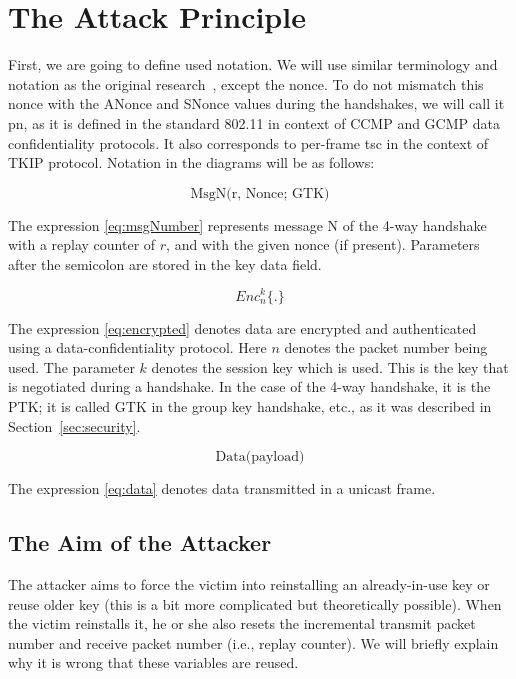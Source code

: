 \section{The Attack Principle}
\label{sec:attackPrinciple}
First, we are going to define used notation. We will use similar terminology and notation as the original research~\cite{VA_ccs2017}, except the nonce. To do not mismatch this nonce with the ANonce and SNonce values during the handshakes, we will call it \gls{pn}, as it is defined in the standard 802.11 in context of CCMP and GCMP data confidentiality protocols. It also corresponds to per-frame \gls{tsc} in the context of TKIP protocol. Notation in the diagrams will be as follows: 

\begin{equation}
\label{eq:msgNumber}
\text{MsgN(r, Nonce; GTK)}
\end{equation}


The expression \eqref{eq:msgNumber} represents message N of the 4-way handshake with a replay counter of $r$, and with the given nonce (if present). Parameters after the semicolon are stored in the key data field.

\begin{equation}
\label{eq:encrypted}
Enc^{k}_{n}\{.\}
\end{equation}

The expression \eqref{eq:encrypted} denotes data are encrypted and authenticated using a data-confidentiality protocol. Here $n$ denotes the packet number being used. The parameter $k$ denotes the session key which is used. This is the key that is negotiated during a handshake. In the case of the 4-way handshake, it is the PTK; it is called GTK in the group key handshake, etc., as it was described in Section~\ref{sec:security}. 

\begin{equation}
\label{eq:data}
\text{Data(payload)}
\end{equation} 

The expression \eqref{eq:data} denotes data transmitted in a unicast frame.

\subsection{The Aim of the Attacker}
\label{subsub:aimOfTheAttacker}

The attacker aims to force the victim into reinstalling an already-in-use key or reuse older key (this is a bit more complicated but theoretically possible). When the victim reinstalls it, he or she also resets the incremental transmit packet number and receive packet number (i.e., replay counter). We will briefly explain why it is wrong that these variables are reused.

